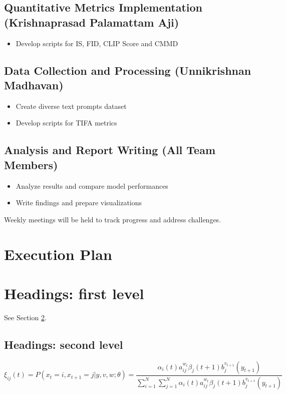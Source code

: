 \documentclass{article}
\begin{document}
\subsection{Quantitative Metrics Implementation (Krishnaprasad Palamattam Aji)}
\begin{itemize}
    \item Develop scripts for IS, FID, CLIP Score and CMMD
\end{itemize}

\subsection{Data Collection and Processing (Unnikrishnan Madhavan)}
\begin{itemize}
    \item Create diverse text prompts dataset
    \item Develop scripts for TIFA metrics
\end{itemize}

\subsection{Analysis and Report Writing (All Team Members)}
\begin{itemize}
    \item Analyze results and compare model performances
    \item Write findings and prepare visualizations
\end{itemize}

Weekly meetings will be held to track progress and address challenges.

\section{Execution Plan}

  


\section{Headings: first level}
\label{sec:headings}

\lipsum[4] See Section \ref{sec:headings}.

\subsection{Headings: second level}
\lipsum[5]
\begin{equation}
\xi _{ij}(t)=P(x_{t}=i,x_{t+1}=j|y,v,w;\theta)= {\frac {\alpha _{i}(t)a^{w_t}_{ij}\beta _{j}(t+1)b^{v_{t+1}}_{j}(y_{t+1})}{\sum _{i=1}^{N} \sum _{j=1}^{N} \alpha _{i}(t)a^{w_t}_{ij}\beta _{j}(t+1)b^{v_{t+1}}_{j}(y_{t+1})}}
\end{equation}
\end{document}
